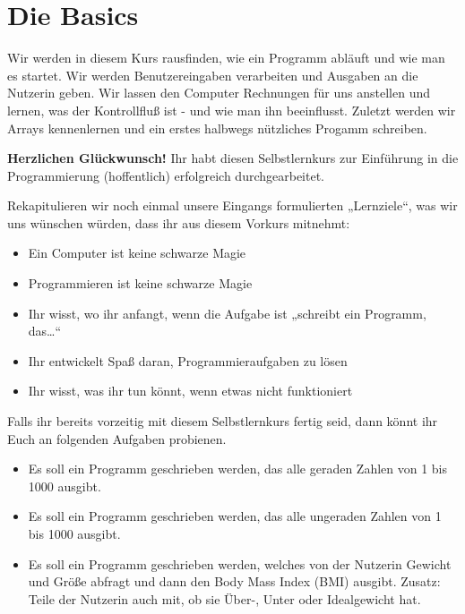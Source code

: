 \chapter{Die Basics}
\pagestyle{empty}


Wir werden in diesem Kurs rausfinden, wie ein Programm abläuft und wie man es
startet. Wir werden Benutzereingaben verarbeiten und Ausgaben an die Nutzerin
geben. Wir lassen den Computer Rechnungen für uns anstellen und lernen, was der
Kontrollfluß ist - und wie man ihn beeinflusst. Zuletzt werden wir Arrays
kennenlernen und ein erstes halbwegs nützliches Progamm schreiben.













\pagebreak
\pagestyle{empty}

\textbf{Herzlichen Glückwunsch!} Ihr habt diesen Selbstlernkurs zur Einführung
in die Programmierung (hoffentlich) erfolgreich durchgearbeitet.

Rekapitulieren wir noch einmal unsere Eingangs formulierten „Lernziele“, was
wir uns wünschen würden, dass ihr aus diesem Vorkurs mitnehmt:
\begin{itemize}
    \item Ein Computer ist keine schwarze Magie
    \item Programmieren ist keine schwarze Magie
    \item Ihr wisst, wo ihr anfangt, wenn die Aufgabe ist „schreibt ein
        Programm, das\dots“
    \item Ihr entwickelt Spaß daran, Programmieraufgaben zu lösen
    \item Ihr wisst, was ihr tun könnt, wenn etwas nicht funktioniert
\end{itemize}

Falls ihr bereits vorzeitig mit diesem Selbstlernkurs fertig seid, dann könnt
ihr Euch an folgenden Aufgaben probienen.

\begin{itemize}
\item Es soll ein Programm geschrieben werden, das alle geraden Zahlen von 1 bis 1000 ausgibt.
\item Es soll ein Programm geschrieben werden, das alle ungeraden Zahlen von 1 bis 1000 ausgibt.
\item Es soll ein Programm geschrieben werden, welches von der Nutzerin Gewicht
  und Größe abfragt und dann den Body Mass Index (BMI) ausgibt. Zusatz: Teile
  der Nutzerin auch mit, ob sie Über-, Unter oder Idealgewicht hat.
\end{itemize}
